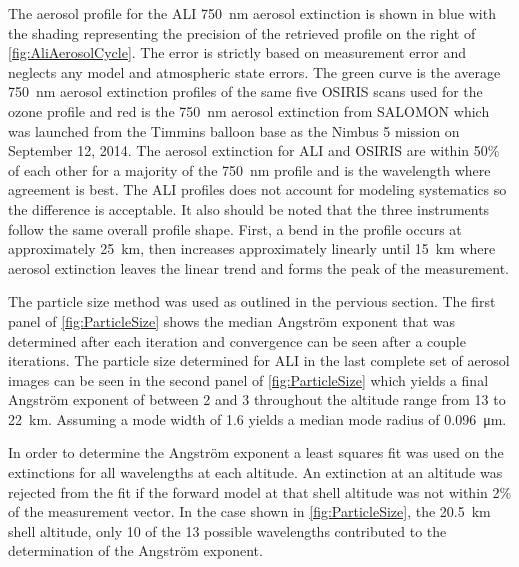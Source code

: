 \documentclass[12pt]{article}
\begin{document}
The aerosol profile for the ALI 750~nm aerosol extinction is shown in blue with the shading representing the precision of the retrieved profile on the right of \autoref{fig:AliAerosolCycle}. The error is strictly based on measurement error and neglects any model and atmospheric state errors. The green curve is the average 750~nm aerosol extinction profiles of the same five OSIRIS scans used for the ozone profile and red is the 750~nm aerosol extinction from SALOMON \citep{Berthet2002} which was launched from the Timmins balloon base as the Nimbus 5 mission on September 12, 2014. The aerosol extinction for ALI and OSIRIS are within 50\% of each other for a majority of the 750~nm profile and is the wavelength where agreement is best. The ALI profiles does not account for modeling systematics so the difference is acceptable. It also should be noted that the three instruments follow the same overall profile shape.  First, a bend in the profile occurs at approximately 25~km, then increases approximately linearly until 15~km where aerosol extinction leaves the linear trend and forms the peak of the measurement.

The particle size method was used as outlined in the pervious section. The first panel of \autoref{fig:ParticleSize} shows the median Angstr\"{o}m exponent that was determined after each iteration and convergence can be seen after a couple iterations. The particle size determined for ALI in the last complete set of aerosol images can be seen in the second panel of \autoref{fig:ParticleSize} which yields a final Angstr\"{o}m exponent of between 2 and 3 throughout the altitude range from 13 to 22~km. Assuming a mode width of 1.6 yields a median mode radius of 0.096~\si{\micro\metre}.

In order to determine the Angstr\"{o}m exponent a least squares fit was used on the extinctions for all wavelengths at each altitude. An extinction at an altitude was rejected from the fit if the forward model at that shell altitude was not within 2\% of the measurement vector. In the case shown in \autoref{fig:ParticleSize}, the 20.5~km shell altitude, only 10 of the 13 possible wavelengths contributed to the determination of the Angstr\"{o}m exponent.
\end{document}
